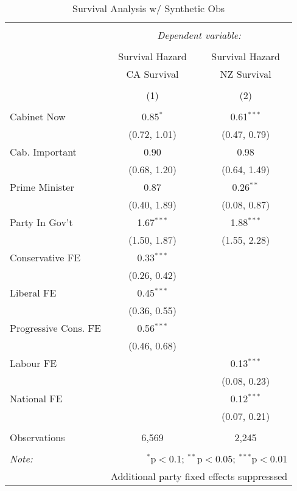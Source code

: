 
\begin{table}[!htb] \centering 
  \caption{Survival Analysis w/ Synthetic Obs} 
  \label{} 
\begin{tabular}{@{\extracolsep{5pt}}lcc} 
\\[-1.8ex]\hline 
\hline \\[-1.8ex] 
 & \multicolumn{2}{c}{\textit{Dependent variable:}} \\ 
\cline{2-3} 
\\[-1.8ex] & Survival Hazard & Survival Hazard \\ 
 & CA Survival & NZ Survival \\ 
\\[-1.8ex] & (1) & (2)\\ 
\hline \\[-1.8ex] 
 Cabinet Now & 0.85$^{*}$ & 0.61$^{***}$ \\ 
  & (0.72, 1.01) & (0.47, 0.79) \\ 
  Cab. Important & 0.90 & 0.98 \\ 
  & (0.68, 1.20) & (0.64, 1.49) \\ 
  Prime Minister & 0.87 & 0.26$^{**}$ \\ 
  & (0.40, 1.89) & (0.08, 0.87) \\ 
  Party In Gov't & 1.67$^{***}$ & 1.88$^{***}$ \\ 
  & (1.50, 1.87) & (1.55, 2.28) \\ 
  Conservative FE & 0.33$^{***}$ &  \\ 
  & (0.26, 0.42) &  \\ 
  Liberal FE & 0.45$^{***}$ &  \\ 
  & (0.36, 0.55) &  \\ 
  Progressive Cons. FE & 0.56$^{***}$ &  \\ 
  & (0.46, 0.68) &  \\ 
  Labour FE &  & 0.13$^{***}$ \\ 
  &  & (0.08, 0.23) \\ 
  National FE &  & 0.12$^{***}$ \\ 
  &  & (0.07, 0.21) \\ 
 \hline \\[-1.8ex] 
Observations & 6,569 & 2,245 \\ 
\hline 
\hline \\[-1.8ex] 
\textit{Note:}  & \multicolumn{2}{r}{$^{*}$p$<$0.1; $^{**}$p$<$0.05; $^{***}$p$<$0.01} \\ 
 & \multicolumn{2}{r}{Additional party fixed effects suppresssed} \\ 
\end{tabular} 
\end{table} 
